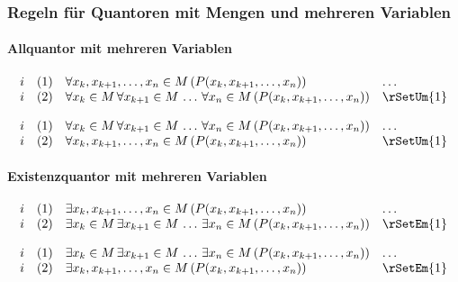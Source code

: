\documentclass{book}
\theoremstyle{plain}
\theoremstyle{remark}
\theoremstyle{definition}
\begin{document}
\subsubsection{Regeln für Quantoren mit Mengen und mehreren Variablen}

\paragraph{Allquantor mit mehreren Variablen}
\label{rule:rSetUm} 
\[
\begin{array}{llll}
    i & (1) & \forall x_k, x_{k+1}, \ldots, x_n \in M \, (P(x_k, x_{k+1}, \ldots, x_n)) & \dots \\
    i & (2) & \forall x_k \in M \, \forall x_{k+1} \in M \, \ldots \, \forall x_n \in M \, (P(x_k, x_{k+1}, \ldots, x_n)) 
            & \rSetUm{1} \\
\end{array}
\]

\[
\begin{array}{llll}
    i & (1) & \forall x_k \in M \, \forall x_{k+1} \in M \, \ldots \, \forall x_n \in M \, (P(x_k, x_{k+1}, \ldots, x_n)) & \dots \\
    i & (2) & \forall x_k, x_{k+1}, \ldots, x_n \in M\, (P(x_k, x_{k+1}, \ldots, x_n)) & \rSetUm{1} \\
\end{array}
\]

\paragraph{Existenzquantor mit mehreren Variablen}
\label{rule:rSetEm}

\[
\begin{array}{llll}
    i & (1) & \exists x_k, x_{k+1}, \ldots, x_n \in M \, (P(x_k, x_{k+1}, \ldots, x_n)) & \dots \\
    i & (2) & \exists x_k \in M \, \exists x_{k+1} \in M \, \ldots \, \exists x_n \in M \, (P(x_k, x_{k+1}, \ldots, x_n)) 
            & \rSetEm{1} \\
\end{array}
\]

\[
\begin{array}{llll}
    i & (1) & \exists x_k \in M \, \exists x_{k+1} \in M \, \ldots \, \exists x_n \in M \, (P(x_k, x_{k+1}, \ldots, x_n)) & \dots \\
    i & (2) & \exists x_k, x_{k+1}, \ldots, x_n \in M \, (P(x_k, x_{k+1}, \ldots, x_n)) & \rSetEm{1} \\
\end{array}
\]
\end{document}
